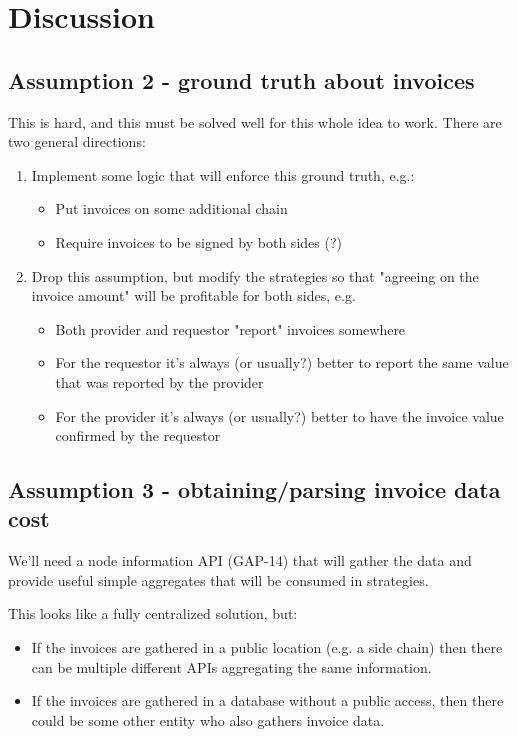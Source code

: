 \documentclass{article}
\begin{document}
\section{Discussion}
\subsection{Assumption 2 - ground truth about invoices}

This is hard, and this must be solved well for this whole idea to work.
There are two general directions:
\begin{enumerate}
    \item Implement some logic that will enforce this ground truth, e.g.:
        \begin{itemize}
            \item Put invoices on some additional chain
            \item Require invoices to be signed by both sides (?)
        \end{itemize}
    \item Drop this assumption, but modify the strategies so that "agreeing on the invoice amount" will be profitable for both sides, e.g.
        \begin{itemize}
            \item Both provider and requestor "report" invoices somewhere
            \item For the requestor it's always (or usually?) better to report the same value that was reported by the provider
            \item For the provider it's always (or usually?) better to have the invoice value confirmed by the requestor
        \end{itemize}
\end{enumerate}

\subsection{Assumption 3 - obtaining/parsing invoice data cost}

We'll need a node information API (GAP-14) that will gather the data and provide useful simple aggregates that will be consumed in strategies.

This looks like a fully centralized solution, but:
\begin{itemize}
    \item If the invoices are gathered in a public location (e.g. a side chain) then there can be multiple different APIs aggregating the same information.
    \item If the invoices are gathered in a database without a public access, then there could be some other entity who also gathers invoice data.
\end{itemize}
\end{document}

